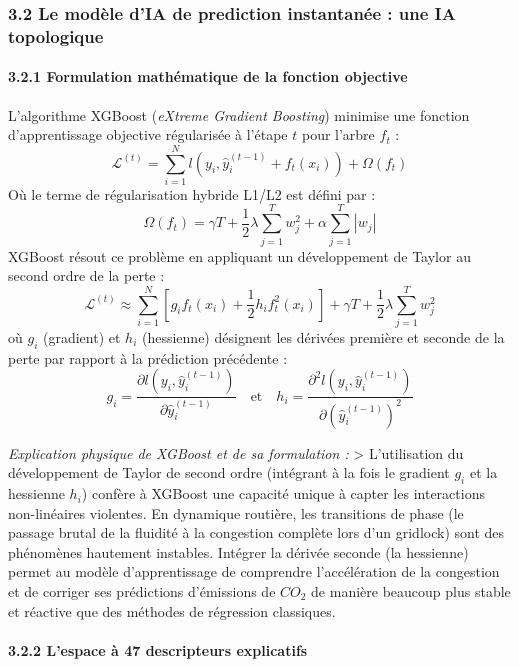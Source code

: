 \documentclass[10pt, a4paper]{article}
\begin{document}
\subsubsection{3.2 Le modèle d'IA de prediction instantanée : une IA
topologique}\label{le-moduxe8le-dia-de-prediction-instantanuxe9e-une-ia-topologique}

\paragraph{3.2.1 Formulation mathématique de la fonction
objective}\label{formulation-mathuxe9matique-de-la-fonction-objective}

L'algorithme XGBoost (\emph{eXtreme Gradient Boosting}) minimise une
fonction d'apprentissage objective régularisée à l'étape \(t\) pour
l'arbre \(f_t\) :
\[\mathcal{L}^{(t)} = \sum_{i=1}^N l\left(y_i, \hat{y}_i^{(t-1)} + f_t(x_i)\right) + \Omega(f_t)\]
Où le terme de régularisation hybride L1/L2 est défini par :
\[\Omega(f_t) = \gamma T + \frac{1}{2} \lambda \sum_{j=1}^T w_j^2 + \alpha \sum_{j=1}^T |w_j|\]
XGBoost résout ce problème en appliquant un développement de Taylor au
second ordre de la perte :
\[\mathcal{L}^{(t)} \approx \sum_{i=1}^N \left[ g_i f_t(x_i) + \frac{1}{2} h_i f_t^2(x_i) \right] + \gamma T + \frac{1}{2} \lambda \sum_{j=1}^T w_j^2\]
où \(g_i\) (gradient) et \(h_i\) (hessienne) désignent les dérivées
première et seconde de la perte par rapport à la prédiction précédente :
\[g_i = \frac{\partial l\left(y_i, \hat{y}_i^{(t-1)}\right)}{\partial \hat{y}_i^{(t-1)}} \quad \text{et} \quad h_i = \frac{\partial^2 l\left(y_i, \hat{y}_i^{(t-1)}\right)}{\partial \left(\hat{y}_i^{(t-1)}\right)^2}\]

\emph{Explication physique de XGBoost et de sa formulation :}
\textgreater{} L'utilisation du développement de Taylor de second ordre
(intégrant à la fois le gradient \(g_i\) et la hessienne \(h_i\))
confère à XGBoost une capacité unique à capter les interactions
non-linéaires violentes. En dynamique routière, les transitions de phase
(le passage brutal de la fluidité à la congestion complète lors d'un
gridlock) sont des phénomènes hautement instables. Intégrer la dérivée
seconde (la hessienne) permet au modèle d'apprentissage de comprendre
l'accélération de la congestion et de corriger ses prédictions
d'émissions de \(CO_2\) de manière beaucoup plus stable et réactive que
des méthodes de régression classiques.

\paragraph{3.2.2 L'espace à 47 descripteurs
explicatifs}\label{lespace-uxe0-47-descripteurs-explicatifs}
\end{document}
